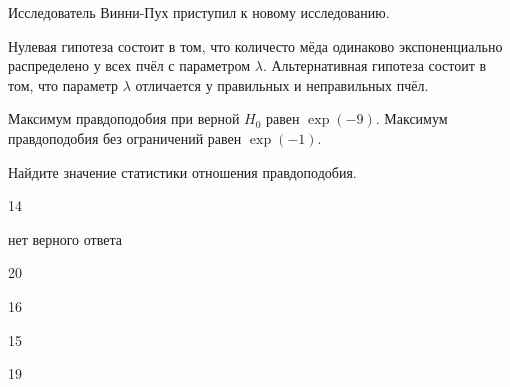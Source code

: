 
\begin{question}
Исследователь Винни-Пух приступил к новому исследованию.

Нулевая гипотеза состоит в том, что количесто мёда одинаково
экспоненциально распределено у всех пчёл с параметром \(\lambda\).
Альтернативная гипотеза состоит в том, что параметр \(\lambda\)
отличается у правильных и неправильных пчёл.

Максимум правдоподобия при верной \(H_0\) равен \(\exp(-9)\). Максимум
правдоподобия без ограничений равен \(\exp(-1)\).

Найдите значение статистики отношения правдоподобия.
\begin{answerlist}
  \item 14
  \item нет верного ответа
  \item 20
  \item 16
  \item 15
  \item 19
\end{answerlist}
\end{question}


